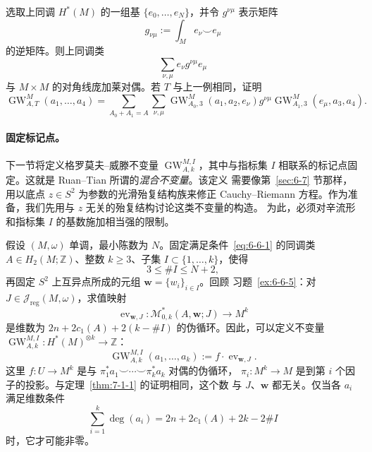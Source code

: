 \begin{exercise}\label{ex:7-2-8}
选取上同调 $H^*(M)$ 的一组基 $\{e_0,\ldots,e_N\}$，并令 $g^{\nu\mu}$ 表示矩阵
\[
  g_{\nu\mu}:=\int_M e_\nu\smile e_\mu
\]
的逆矩阵。则上同调类
\[
  \sum_{\nu,\mu}e_\nu g^{\nu\mu}e_\mu
\]
与 $M\times M$ 的对角线庞加莱对偶。若 $T$ 与上一例相同，证明
\[
  \operatorname{GW}^{M}_{A,T}(a_1,\ldots,a_4)
  =\sum_{A_0+A_1=A}\sum_{\nu,\mu}
  \operatorname{GW}^{M}_{A_0,3}(a_1,a_2,e_\nu)
  g^{\nu\mu}
  \operatorname{GW}^{M}_{A_1,3}(e_\mu,a_3,a_4).
\]
\end{exercise}

\paragraph{固定标记点。}
下一节将定义格罗莫夫--威滕不变量 $\operatorname{GW}^{M,I}_{A,k}$，其中与指标集 $I$
相联系的标记点固定。这就是 Ruan--Tian  所谓的\emph{混合不变量}。该定义
需要像第~\ref{sec:6-7} 节那样，用以底点 $z\in S^2$ 为参数的光滑殆复结构族来修正
Cauchy--Riemann 方程。作为准备，我们先用与 $z$ 无关的殆复结构讨论这类不变量的构造。
为此，必须对辛流形和指标集 $I$ 的基数施加相当强的限制。

假设 $(M,\omega)$ 单调，最小陈数为 $N$。固定满足条件~\eqref{eq:6-6-1} 的同调类
$A\in H_2(M;\mathbb Z)$、整数 $k\geq3$、子集 $I\subset\{1,\ldots,k\}$，使得
\[
  3\leq\#I\leq N+2,
\]
再固定 $S^2$ 上互异点所成的元组 $\mathbf w=\{w_i\}_{i\in I}$。回顾
习题~\ref{ex:6-6-5}：对 $J\in\mathcal J_{\mathrm{reg}}(M,\omega)$，求值映射
\[
  \operatorname{ev}_{\mathbf w,J}:
  \mathcal M^*_{0,k}(A,\mathbf w;J)\longrightarrow M^k
\]
是维数为 $2n+2c_1(A)+2(k-\#I)$ 的伪循环。因此，可以定义不变量
$\operatorname{GW}^{M,I}_{A,k}:H^*(M)^{\otimes k}\to\mathbb Z$：
\begin{equation}\label{eq:7-2-10}
  \operatorname{GW}^{M,I}_{A,k}(a_1,\ldots,a_k)
  :=f\cdot\operatorname{ev}_{\mathbf w,J}.
\end{equation}
这里 $f:U\to M^k$ 是与
$\pi_1^*a_1\smile\cdots\smile\pi_k^*a_k$ 对偶的伪循环，
$\pi_i:M^k\to M$ 是到第 $i$ 个因子的投影。与定理~\ref{thm:7-1-1} 的证明相同，这个数
与 $J$、$\mathbf w$ 都无关。仅当各 $a_i$ 满足维数条件
\begin{equation}\label{eq:7-2-11}
  \sum_{i=1}^{k}\deg(a_i)
  =2n+2c_1(A)+2k-2\#I
\end{equation}
时，它才可能非零。

